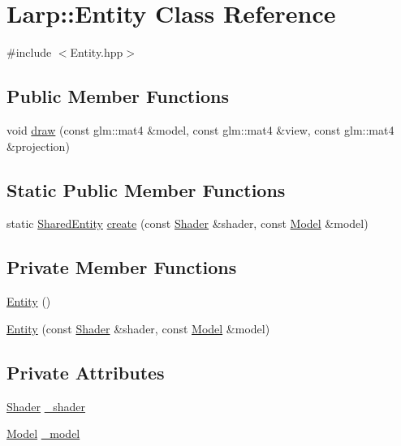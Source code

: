 \hypertarget{classLarp_1_1Entity}{\section{Larp\-:\-:Entity Class Reference}
\label{classLarp_1_1Entity}
}


{\ttfamily \#include $<$Entity.\-hpp$>$}

\subsection*{Public Member Functions}
\begin{DoxyCompactItemize}
\item 
void \hyperlink{classLarp_1_1Entity_a2531d3e43c8c6046d5879881392365ad}{draw} (const glm\-::mat4 \&model, const glm\-::mat4 \&view, const glm\-::mat4 \&projection)
\end{DoxyCompactItemize}
\subsection*{Static Public Member Functions}
\begin{DoxyCompactItemize}
\item 
static \hyperlink{namespaceLarp_ae3ffca1f126e4263cbdc59b116ee465a}{Shared\-Entity} \hyperlink{classLarp_1_1Entity_a60a75b3e2fee6e05c774c79142e47ae0}{create} (const \hyperlink{classLarp_1_1Shader}{Shader} \&shader, const \hyperlink{classLarp_1_1Model}{Model} \&model)
\end{DoxyCompactItemize}
\subsection*{Private Member Functions}
\begin{DoxyCompactItemize}
\item 
\hyperlink{classLarp_1_1Entity_ad4b4badc7c5cb0fc6b3f2dc3525060e8}{Entity} ()
\item 
\hyperlink{classLarp_1_1Entity_ad5f6b1da9de62146b4c1c5a4cd4f2bc8}{Entity} (const \hyperlink{classLarp_1_1Shader}{Shader} \&shader, const \hyperlink{classLarp_1_1Model}{Model} \&model)
\end{DoxyCompactItemize}
\subsection*{Private Attributes}
\begin{DoxyCompactItemize}
\item 
\hyperlink{classLarp_1_1Shader}{Shader} \hyperlink{classLarp_1_1Entity_a237a03d104060dcf5db941d8b4bd5a5a}{\-\_\-shader}
\item 
\hyperlink{classLarp_1_1Model}{Model} \hyperlink{classLarp_1_1Entity_afdfe4aa2819f1ba5d0623cd034bec14e}{\-\_\-model}
\end{DoxyCompactItemize}


